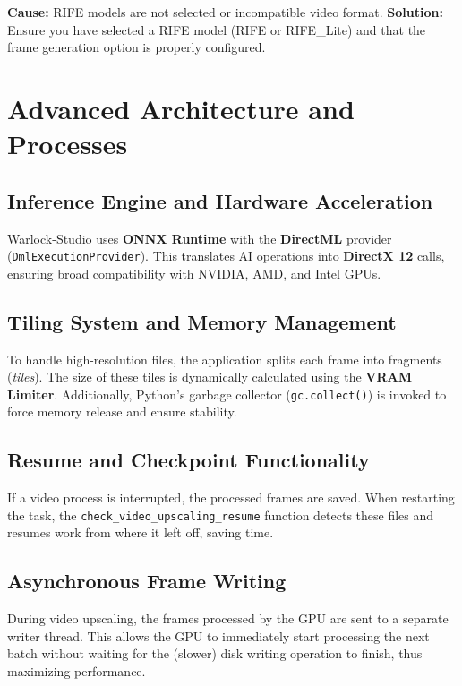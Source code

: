 \documentclass[11pt, a4paper]{article}
\newcommand{\inlinecode}[1]{\colorbox{WarlockLightGray}{\small\texttt{#1}}}
\begin{document}
\begin{description}[leftmargin=*, style=nextline, itemsep=0.8em]
    \item[\faExclamationTriangle\ Issue: Frame interpolation not working]
        \textbf{Cause:} RIFE models are not selected or incompatible video format.
        \textbf{Solution:} Ensure you have selected a RIFE model (RIFE or RIFE\_Lite) and that the frame generation option is properly configured.
\end{description}

\section{Advanced Architecture and Processes}

\subsection{Inference Engine and Hardware Acceleration}
Warlock-Studio uses \textbf{ONNX Runtime} with the \textbf{DirectML} provider (\inlinecode{DmlExecutionProvider}). This translates AI operations into \textbf{DirectX 12} calls, ensuring broad compatibility with NVIDIA, AMD, and Intel GPUs.

\subsection{Tiling System and Memory Management}
To handle high-resolution files, the application splits each frame into fragments (\textit{tiles}). The size of these tiles is dynamically calculated using the \textbf{VRAM Limiter}. Additionally, Python's garbage collector (\inlinecode{gc.collect()}) is invoked to force memory release and ensure stability.

\subsection{Resume and Checkpoint Functionality}
If a video process is interrupted, the processed frames are saved. When restarting the task, the \inlinecode{check\_video\_upscaling\_resume} function detects these files and resumes work from where it left off, saving time.

\subsection{Asynchronous Frame Writing}
During video upscaling, the frames processed by the GPU are sent to a separate writer thread. This allows the GPU to immediately start processing the next batch without waiting for the (slower) disk writing operation to finish, thus maximizing performance.
\end{document}
